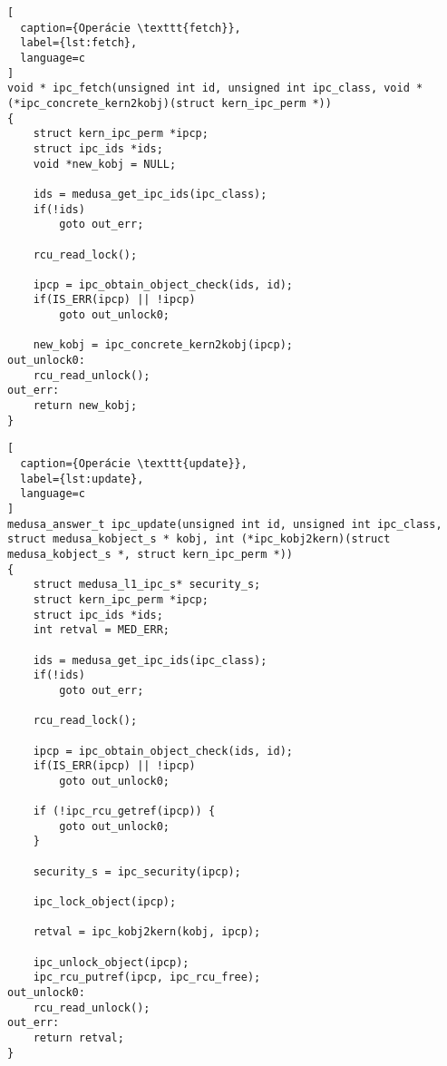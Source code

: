 \begin{lstlisting}[
  caption={Operácie \texttt{fetch}},
  label={lst:fetch},
  language=c
]
void * ipc_fetch(unsigned int id, unsigned int ipc_class, void * (*ipc_concrete_kern2kobj)(struct kern_ipc_perm *))
{
	struct kern_ipc_perm *ipcp;
	struct ipc_ids *ids;
	void *new_kobj = NULL;

	ids = medusa_get_ipc_ids(ipc_class);
	if(!ids)
		goto out_err;

	rcu_read_lock();

	ipcp = ipc_obtain_object_check(ids, id);
	if(IS_ERR(ipcp) || !ipcp)
		goto out_unlock0;

	new_kobj = ipc_concrete_kern2kobj(ipcp);
out_unlock0:
	rcu_read_unlock();
out_err:
	return new_kobj;
}
\end{lstlisting}

\begin{lstlisting}[
  caption={Operácie \texttt{update}},
  label={lst:update},
  language=c
]
medusa_answer_t ipc_update(unsigned int id, unsigned int ipc_class, struct medusa_kobject_s * kobj, int (*ipc_kobj2kern)(struct medusa_kobject_s *, struct kern_ipc_perm *))
{
	struct medusa_l1_ipc_s* security_s;
	struct kern_ipc_perm *ipcp;
	struct ipc_ids *ids;
	int retval = MED_ERR;
	
	ids = medusa_get_ipc_ids(ipc_class);
	if(!ids)
		goto out_err;
	
	rcu_read_lock();

	ipcp = ipc_obtain_object_check(ids, id);
	if(IS_ERR(ipcp) || !ipcp)
		goto out_unlock0;

	if (!ipc_rcu_getref(ipcp)) {
		goto out_unlock0;
	}

	security_s = ipc_security(ipcp);

	ipc_lock_object(ipcp);

	retval = ipc_kobj2kern(kobj, ipcp);
		
	ipc_unlock_object(ipcp);
	ipc_rcu_putref(ipcp, ipc_rcu_free);
out_unlock0:
	rcu_read_unlock();
out_err:
	return retval;
}
\end{lstlisting}


